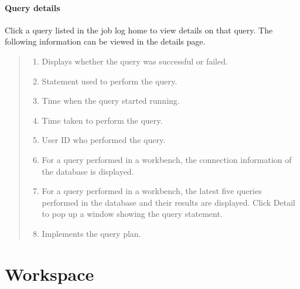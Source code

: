 \documentclass[letterpaper,10pt,english]{sphinxmanual}
\begin{document}
\subsubsection{Query details}
\label{\detokenize{discovery/part02/data_monitoring:id4}}
Click a query listed in the job log home to view details on that query. The following information can be viewed in the details page.
\begin{quote}

\begin{figure}[H]
\centering

\noindent{}
\end{figure}
\begin{enumerate}
\def\theenumi{\arabic{enumi}}
\def\labelenumi{\theenumi .}
\makeatletter\def\p@enumii{\p@enumi \theenumi .}\makeatother
\item {} 
 Displays whether the query was successful or failed.

\item {} 
 Statement used to perform the query.

\item {} 
 Time when the query started running.

\item {} 
 Time taken to perform the query.

\item {} 
 User ID who performed the query.

\item {} 
 For a query performed in a workbench, the connection information of the database is displayed.

\item {} 
 For a query performed in a workbench, the latest five queries performed in the database and their results are displayed. Click Detail to pop up a window showing the query statement.

\item {} 
 Implements the query plan.

\end{enumerate}
\end{quote}


\chapter{Workspace}
\label{\detokenize{discovery/part03/index:id1}}\label{\detokenize{discovery/part03/index::doc}}
\begin{figure}[H]
\centering

\noindent{}
\end{figure}
\end{document}
